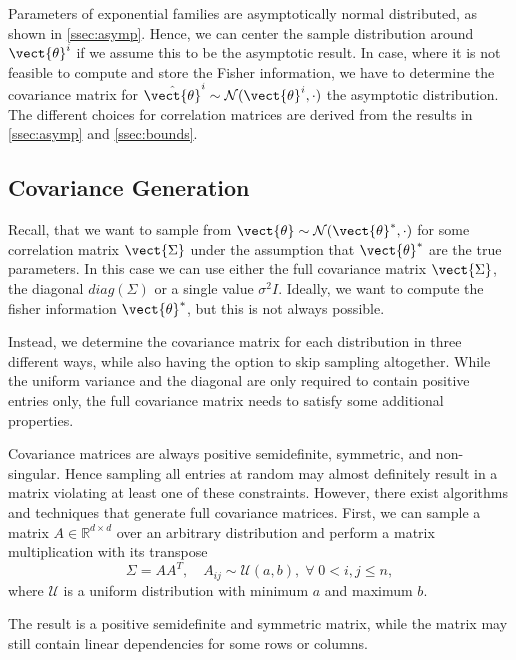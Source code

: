 Parameters of exponential families are asymptotically normal distributed, as shown in \autoref{ssec:asymp}.
Hence, we can center the sample distribution around $\vect{\theta}^i$ if we assume this to be the asymptotic result.
In case, where it is not feasible to compute and store the Fisher information, we have to determine the covariance matrix for $\hat{\vect{\theta}}^i \sim \mathcal{N}(\vect{\theta}^i, \cdot)$ the asymptotic distribution.
The different choices for correlation matrices are derived from the results in \autoref{ssec:asymp} and \autoref{ssec:bounds}.

\subsection{Covariance Generation}
\label{ssec:covgen}

Recall, that we want to sample from $\vect{\theta} \sim \mathcal{N}(\vect{\theta}^*, \cdot)$ for some correlation matrix $\vect{\Sigma}$ under the assumption that $\vect{\theta}^*$ are the true parameters.
In this case we can use either the full covariance matrix $\vect{\Sigma}$, the diagonal $diag(\Sigma)$ or a single value $\sigma^2 I$.
Ideally, we want to compute the fisher information \wrt $\vect{\theta}^*$, but this is not always possible.

Instead, we determine the covariance matrix for each distribution in three different ways, while also having the option to skip sampling altogether.
While the uniform variance and the diagonal are only required to contain positive entries only, the full covariance matrix needs to satisfy some additional properties.

Covariance matrices are always positive semidefinite, symmetric, and non-singular. 
Hence sampling all entries at random may almost definitely result in a matrix violating at least one of these constraints.
However, there exist algorithms and techniques that generate full covariance matrices.
First, we can sample a matrix $A\in \mathbb{R}^{d \times d}$ over an arbitrary distribution and perform a matrix multiplication with its transpose
\begin{equation}
    \Sigma = AA^T, \quad A_{ij}\sim\mathcal{U}(a,b), \; \forall \;0 < i,j \leq n,
\end{equation}
where $\mathcal{U}$ is a uniform distribution with minimum $a$ and maximum $b$.

The result is a positive semidefinite and symmetric matrix, while the matrix may still contain linear dependencies for some rows or columns.

